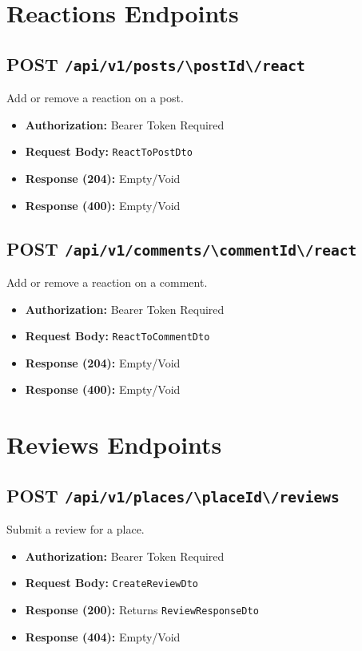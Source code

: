 \section{Reactions Endpoints}

\subsection{POST \texttt{/api/v1/posts/\textbackslash{}{postId\textbackslash{}}/react}}
Add or remove a reaction on a post.
\begin{itemize}
    \item \textbf{Authorization:} Bearer Token Required
    \item \textbf{Request Body:} \texttt{ReactToPostDto}
    \item \textbf{Response (204):} Empty/Void
    \item \textbf{Response (400):} Empty/Void
\end{itemize}

\subsection{POST \texttt{/api/v1/comments/\textbackslash{}{commentId\textbackslash{}}/react}}
Add or remove a reaction on a comment.
\begin{itemize}
    \item \textbf{Authorization:} Bearer Token Required
    \item \textbf{Request Body:} \texttt{ReactToCommentDto}
    \item \textbf{Response (204):} Empty/Void
    \item \textbf{Response (400):} Empty/Void
\end{itemize}

\section{Reviews Endpoints}

\subsection{POST \texttt{/api/v1/places/\textbackslash{}{placeId\textbackslash{}}/reviews}}
Submit a review for a place.
\begin{itemize}
    \item \textbf{Authorization:} Bearer Token Required
    \item \textbf{Request Body:} \texttt{CreateReviewDto}
    \item \textbf{Response (200):} Returns \texttt{ReviewResponseDto}
    \item \textbf{Response (404):} Empty/Void
\end{itemize}

